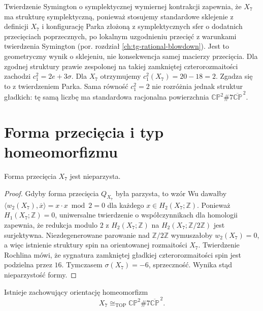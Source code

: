 \begin{przyklad}
Twierdzenie Symington o symplektycznej wymiernej kontrakcji
zapewnia, że $X_7$ ma strukturę symplektyczną, ponieważ
stosujemy standardowe sklejenie z definicji $X_7$
i konfigurację Parka złożoną z symplektycznych sfer
o dodatnich przecięciach poprzecznych, po lokalnym
uzgodnieniu przecięć z warunkami twierdzenia Symington
(por. rozdział \ref{ch:tg-rational-blowdown}).
Jest to geometryczny wynik o sklejeniu, nie
konsekwencja samej macierzy przecięcia. Dla zgodnej struktury prawie
zespolonej na takiej zamkniętej czterorozmaitości zachodzi
$c_1^2=2e+3\sigma$. Dla $X_7$ otrzymujemy
$c_1^2(X_7)=20-18=2$.
Zgadza się to z twierdzeniem Parka. Sama równość
$c_1^2=2$ nie rozróżnia jednak struktur gładkich:
tę samą liczbę ma standardowa racjonalna powierzchnia
$\mathbb{CP}^{2}\#7\overline{\mathbb{CP}}^{\,2}$.
\end{przyklad}

\section{Forma przecięcia i typ homeomorfizmu}
\label{sec:tg-park-homeo}

\begin{lemat}
\label{lem:tg-park-odd}
Forma przecięcia $X_7$ jest nieparzysta.
\end{lemat}

\begin{proof}
Gdyby forma przecięcia $Q_{X_7}$ była parzysta,
to wzór Wu dawałby
$\langle w_2(X_7),\overline{x}\rangle
=x\cdot x\bmod 2=0$
dla każdego $x\in H_2(X_7;\mathbb Z)$.
Ponieważ $H_1(X_7;\mathbb Z)=0$,
uniwersalne twierdzenie o współczynnikach
dla homologii zapewnia, że redukcja modulo $2$
z $H_2(X_7;\mathbb Z)$ na
$H_2(X_7;\mathbb Z/2\mathbb Z)$ jest surjektywna.
Niezdegenerowane parowanie nad $\mathbb Z/2\mathbb Z$
wymuszałoby $w_2(X_7)=0$, a więc istnienie
struktury spin na orientowanej rozmaitości $X_7$.
Twierdzenie Rochlina mówi, że sygnatura zamkniętej
gładkiej czterorozmaitości spin jest podzielna przez $16$.
Tymczasem $\sigma(X_7)=-6$, sprzeczność.
Wynika stąd nieparzystość formy.
\end{proof}

\begin{twierdzenie}
\label{thm:tg-park-homeo}
Istnieje zachowujący orientację homeomorfizm
\[
X_7\cong_{\mathrm{TOP}}
\mathbb{CP}^{2}\#7\overline{\mathbb{CP}}^{\,2}.
\]
\end{twierdzenie}


